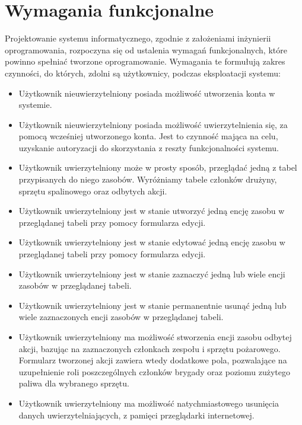 \section{Wymagania funkcjonalne}

Projektowanie systemu informatycznego, zgodnie z założeniami inżynierii oprogramowania, rozpoczyna się od ustalenia wymagań funkcjonalnych, które powinno spełniać tworzone oprogramowanie. Wymagania te formułują zakres czynności, do których, zdolni są użytkownicy, podczas eksploatacji systemu:

\begin{itemize}
    \item Użytkownik nieuwierzytelniony posiada możliwość utworzenia konta w systemie.
    \item Użytkownik nieuwierzytelniony posiada możliwość uwierzytelnienia się, za pomocą wcześniej utworzonego konta. Jest to czynność mająca na celu, uzyskanie autoryzacji do skorzystania z reszty funkcjonalności systemu.
    \item Użytkownik uwierzytelniony może w prosty sposób, przeglądać jedną z tabel przypisanych do niego zasobów. Wyróżniamy tabele członków drużyny, sprzętu spalinowego oraz odbytych akcji.
    \item Użytkownik uwierzytelniony jest w stanie utworzyć jedną encję zasobu w przeglądanej tabeli przy pomocy formularza edycji.
    \item Użytkownik uwierzytelniony jest w stanie edytować jedną encję zasobu w przeglądanej tabeli przy pomocy formularza edycji.
    \item Użytkownik uwierzytelniony jest w stanie zaznaczyć jedną lub wiele encji zasobów w przeglądanej tabeli.
    \item Użytkownik uwierzytelniony jest w stanie permanentnie usunąć jedną lub wiele zaznaczonych encji zasobów w przeglądanej tabeli.
    \item Użytkownik uwierzytelniony ma możliwość stworzenia encji zasobu odbytej akcji, bazując na zaznaczonych członkach zespołu i sprzętu pożarowego. Formularz tworzonej akcji zawiera wtedy dodatkowe pola, pozwalające na uzupełnienie roli poszczególnych członków brygady oraz poziomu zużytego paliwa dla wybranego sprzętu.
    \item Użytkownik uwierzytelniony ma możliwość natychmiastowego usunięcia danych uwierzytelniających, z pamięci przeglądarki internetowej.
\end{itemize}

